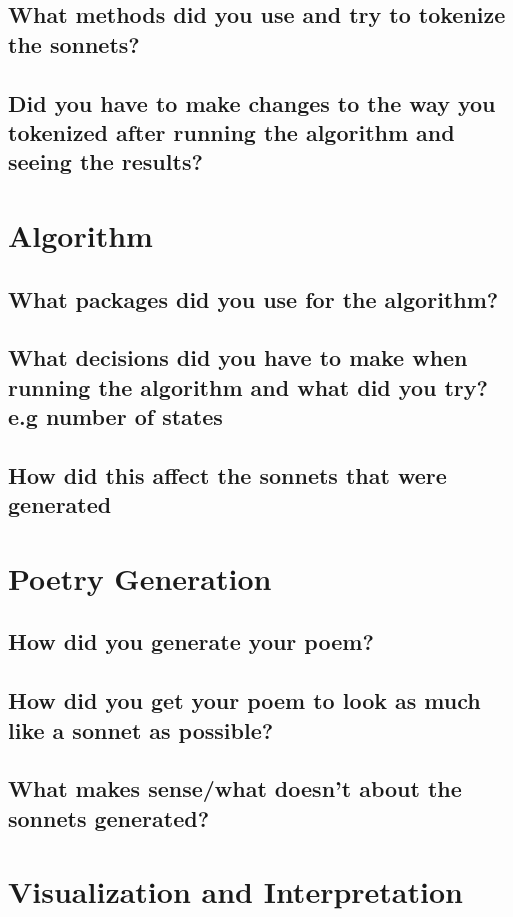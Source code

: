 \subsection{What methods did you use and try to tokenize the sonnets?}
\subsection{Did you have to make changes to the way you tokenized after running the algorithm and seeing the results?}


\section{Algorithm}
\medskip

\subsection{What packages did you use for the algorithm?}
\subsection{What decisions did you have to make when running the algorithm and what did you try? e.g number of states}
\subsection{How did this affect the sonnets that were generated}

\section{Poetry Generation}
\medskip

\subsection{How did you generate your poem?}
\subsection{How did you get your poem to look as much like a sonnet as possible?}
\subsection{What makes sense/what doesn't about the sonnets generated?}


\section{Visualization and Interpretation}
\medskip

